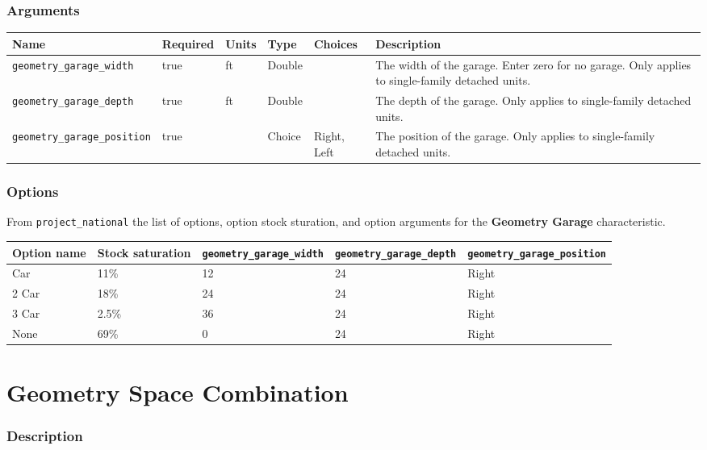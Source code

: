 \subsubsection{Arguments}\label{arguments-36}

\begin{longtable}[]{@{}llllll@{}}
\toprule\noalign{}
Name & Required & Units & Type & Choices & Description \\
\midrule\noalign{}
\endhead
\bottomrule\noalign{}
\endlastfoot
\texttt{geometry\_garage\_width} & true & ft & Double & & The width of
the garage. Enter zero for no garage. Only applies to single-family
detached units. \\
\texttt{geometry\_garage\_depth} & true & ft & Double & & The depth of
the garage. Only applies to single-family detached units. \\
\texttt{geometry\_garage\_position} & true & & Choice & Right, Left &
The position of the garage. Only applies to single-family detached
units. \\
\end{longtable}

\subsubsection{Options}\label{options-55}

From \texttt{project\_national} the list of options, option stock
sturation, and option arguments for the \textbf{Geometry Garage}
characteristic.

\begin{longtable}[]{@{}lllll@{}}
\toprule\noalign{}
Option name & Stock saturation & \texttt{geometry\_garage\_width} &
\texttt{geometry\_garage\_depth} &
\texttt{geometry\_garage\_position} \\
\midrule\noalign{}
\endhead
\bottomrule\noalign{}
\endlastfoot
1 Car & 11\% & 12 & 24 & Right \\
2 Car & 18\% & 24 & 24 & Right \\
3 Car & 2.5\% & 36 & 24 & Right \\
None & 69\% & 0 & 24 & Right \\
\end{longtable}

\section{Geometry Space
Combination}\label{geometry_space_combination}

\subsubsection{Description}\label{description-56}

